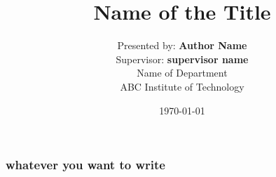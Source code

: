 \documentclass[10pt]{beamer}
\title{Name of the Title}
\author[Author Name]{%
    Presented by: {\textbf{Author Name}} \\
    Supervisor: {\textbf{supervisor name}} \\[4ex]
    Name of Department\\ 
    ABC Institute of Technology}
\date{\today}
\begin{document}
\begin{frame}
    \frametitle{whatever you want to write}
    \titlepage
\end{frame}
\end{document}
